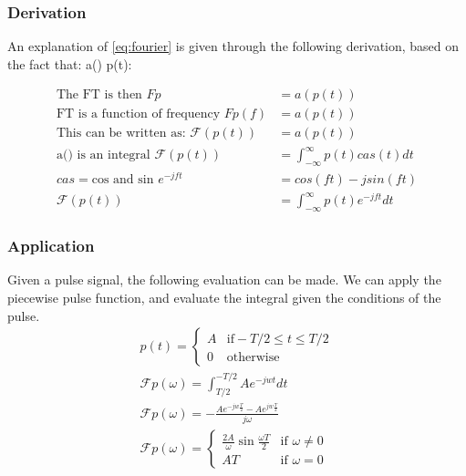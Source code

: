 \subsubsection{Derivation}

An explanation of \ref{eq:fourier} is given through the following derivation, based on the fact that: a()  p(t):

\begingroup
\addtolength{\jot}{1em}
\begin{align*}
    \text{The FT is then } Fp &= a(p(t)) \\
    \text{FT is a function of frequency } Fp(f) &= a(p(t)) \\
    \text{This can be written as: } \mathcal{F}(p(t)) &= a(p(t)) \\
    \text{a() is an integral } \mathcal{F}(p(t)) &= \int_{-\infty}^{\infty}p(t)cas(t)dt \\
    cas = \text{cos and sin } e^{-jft} &= cos(ft) - \textit{j}sin(ft) \\
    \mathcal{F}(p(t)) &= \int_{-\infty}^{\infty} p(t)e^{-jft}dt
\end{align*}
\endgroup

\subsubsection{Application}
Given a pulse signal, the following evaluation can be made.
We can apply the piecewise pulse function, and evaluate the integral given the conditions of the pulse.
\begin{align}
    p(t) = \begin{cases}
            A & \text{if} -T/2\leq t \leq T/2 \\
            0 & \text{otherwise}
            \end{cases} \\
    \mathcal{F}p(\omega) = \int_{T/2}^{-T/2}Ae^{-jwt}dt \\
    \mathcal{F}p(\omega) = - \frac{Ae^{-jw\frac{T}{2}} - Ae^{jw\frac{T}{2}}}{j\omega} \\
    \mathcal{F}p(\omega) = \begin{cases}
                         \frac{2A}{\omega}\sin{\frac{\omega T}{2}} & \text{if } \omega \neq 0 \\
                         AT & \text{if } \omega = 0 
                            \end{cases}
\end{align}

\newpage

